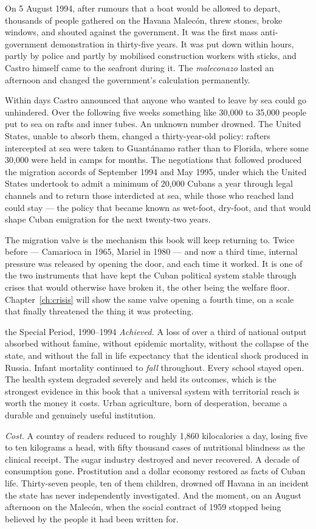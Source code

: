 On 5 August 1994, after rumours that a boat would be allowed to depart,
thousands of people gathered on the Havana Malec\'on, threw stones, broke
windows, and shouted against the government. It was the first mass anti-
government demonstration in thirty-five years. It was put down within hours,
partly by police and partly by mobilised construction workers with sticks, and
Castro himself came to the seafront during it. The \emph{maleconazo} lasted an
afternoon and changed the government's calculation permanently.

Within days Castro announced that anyone who wanted to leave by sea could go
unhindered. Over the following five weeks something like 30,000 to 35,000 people
put to sea on rafts and inner tubes.\unv{} An unknown number drowned. The United
States, unable to absorb them, changed a thirty-year-old policy: rafters
intercepted at sea were taken to Guant\'anamo rather than to Florida, where
some 30,000 were held in camps for months. The negotiations that followed
produced the migration accords of September 1994 and May 1995, under which the
United States undertook to admit a minimum of 20,000 Cubans a year through
legal channels and to return those interdicted at sea, while those who reached
land could stay --- the policy that became known as wet-foot, dry-foot, and that
would shape Cuban emigration for the next twenty-two years.

The migration valve is the mechanism this book will keep returning to. Twice
before --- Camarioca in 1965, Mariel in 1980 --- and now a third time, internal
pressure was released by opening the door, and each time it worked. It is one of
the two instruments that have kept the Cuban political system stable through
crises that would otherwise have broken it, the other being the welfare floor.
Chapter~\ref{ch:crisis} will show the same valve opening a fourth time, on a
scale that finally threatened the thing it was protecting.

\begin{ledger}{the Special Period, 1990--1994}
\emph{Achieved.} A loss of over a third of national output absorbed without
famine, without epidemic mortality, without the collapse of the state, and
without the fall in life expectancy that the identical shock produced in
Russia. Infant mortality continued to \emph{fall} throughout. Every school
stayed open. The health system degraded severely and held its outcomes, which
is the strongest evidence in this book that a universal system with
territorial reach is worth the money it costs. Urban agriculture, born of
desperation, became a durable and genuinely useful institution.

\emph{Cost.} A country of readers reduced to roughly 1,860 kilocalories a day,
losing five to ten kilograms a head, with fifty thousand cases of nutritional
blindness as the clinical receipt. The sugar industry destroyed and never
recovered. A decade of consumption gone. Prostitution and a dollar economy
restored as facts of Cuban life. Thirty-seven people, ten of them children,
drowned off Havana in an incident the state has never independently
investigated. And the moment, on an August afternoon on the Malec\'on, when the
social contract of 1959 stopped being believed by the people it had been
written for.
\end{ledger}
